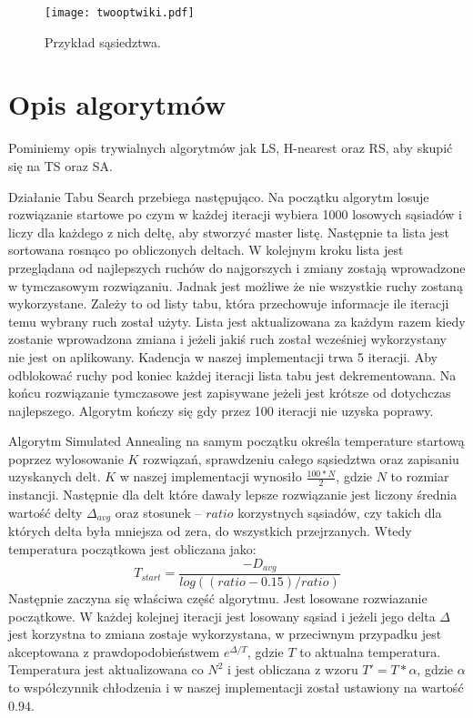 \documentclass{article}
\begin{document}
\begin{figure} 
\begin{center}
\texttt{[image: twooptwiki.pdf]}
\end{center}
\caption{Przykład sąsiedztwa.}
\label{fig:schemat2}
\end{figure}


\section{Opis algorytmów}

Pominiemy opis trywialnych algorytmów jak LS, H-nearest oraz RS, aby skupić się na TS oraz SA.

Działanie Tabu Search przebiega następująco. Na początku algorytm losuje rozwiązanie startowe po czym w każdej iteracji wybiera 1000 losowych sąsiadów i liczy dla każdego z nich deltę, aby stworzyć master listę. Następnie ta lista jest sortowana rosnąco po obliczonych deltach. W kolejnym kroku lista jest przeglądana od najlepszych ruchów do najgorszych i zmiany zostają wprowadzone w tymczasowym rozwiązaniu. Jadnak jest możliwe że nie wszystkie ruchy zostaną wykorzystane. Zależy to od listy tabu, która przechowuje informacje ile iteracji temu wybrany ruch został użyty. Lista jest aktualizowana za każdym razem kiedy zostanie wprowadzona zmiana i jeżeli jakiś ruch został wcześniej wykorzystany nie jest on aplikowany. Kadencja w naszej implementacji trwa 5 iteracji. Aby odblokować ruchy pod koniec każdej iteracji lista tabu jest dekrementowana. Na końcu rozwiązanie tymczasowe jest zapisywane jeżeli jest krótsze od dotychczas najlepszego. Algorytm kończy się gdy przez 100 iteracji nie uzyska poprawy.


Algorytm Simulated Annealing na samym początku określa temperature startową poprzez wylosowanie $K$ rozwiązań, sprawdzeniu całego sąsiedztwa oraz zapisaniu uzyskanych delt. $K$ w naszej implementacji wynosiło $\frac{100 * N}{2}$, gdzie $N$ to rozmiar instancji. Następnie dla delt które dawały lepsze rozwiązanie jest liczony średnia wartość delty $\Delta_{avg}$ oraz stosunek -- $ratio$ korzystnych sąsiadów, czy takich dla których delta była mniejsza od zera, do wszystkich przejrzanych. Wtedy temperatura początkowa jest obliczana jako:
$$
T_{start} = \frac{-D_{avg}}{log((ratio - 0.15) / ratio)}
$$
Następnie zaczyna się właściwa część algorytmu. Jest losowane rozwiazanie początkowe. W każdej kolejnej iteracji jest losowany sąsiad i jeżeli jego delta $\Delta$ jest korzystna to zmiana zostaje wykorzystana, w przeciwnym przypadku jest akceptowana z prawdopodobieństwem $e^{\Delta/T}$, gdzie $T$ to aktualna temperatura. Temperatura jest aktualizowana co $N^2$ i jest obliczana z wzoru $T'=T*\alpha$, gdzie $\alpha$ to współczynnik chłodzenia i w naszej implementacji został ustawiony na wartość $0.94$.
\end{document}

